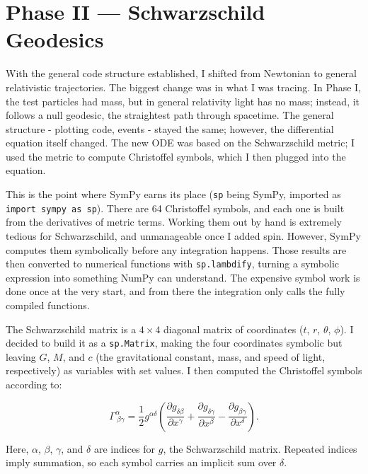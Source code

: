 \documentclass[11pt,a4paper]{article}
\begin{document}
\section{Phase II — Schwarzschild Geodesics}
\label{sec:schwarzschild}
With the general code structure established, I shifted from Newtonian to general relativistic trajectories. The biggest change was in what I was tracing. In Phase I, the test particles had mass, but in general relativity light has no mass; instead, it follows a null geodesic, the straightest path through spacetime. The general structure - plotting code, events - stayed the same; however, the differential equation itself changed. The new ODE was based on the Schwarzschild metric; I used the metric to compute Christoffel symbols, which I then plugged into the equation.

This is the point where SymPy earns its place (\texttt{sp} being SymPy, imported as \texttt{import sympy as sp}). There are 64 Christoffel symbols, and each one is built from the derivatives of metric terms. Working them out by hand is extremely tedious for Schwarzschild, and unmanageable once I added spin. However, SymPy computes them symbolically before any integration happens. Those results are then converted to numerical functions with \texttt{sp.lambdify}, turning a symbolic expression into something NumPy can understand. The expensive symbol work is done once at the very start, and from there the integration only calls the fully compiled functions.

The Schwarzschild matrix is a $4\times4$ diagonal matrix of coordinates ($t$, $r$, $\theta$, $\phi$). I decided to build it as a \texttt{sp.Matrix}, making the four coordinates symbolic but leaving $G$, $M$, and $c$ (the gravitational constant, mass, and speed of light, respectively) as variables with set values. I then computed the Christoffel symbols according to:

\begin{equation}
    \Gamma^{\alpha}_{\ \beta\gamma} = \frac{1}{2} g^{\alpha\delta}
    \left( \frac{\partial g_{\delta\beta}}{\partial x^{\gamma}}
         + \frac{\partial g_{\delta\gamma}}{\partial x^{\beta}}
         - \frac{\partial g_{\beta\gamma}}{\partial x^{\delta}} \right).
    \label{eq:christoffel}
\end{equation}

Here, $\alpha$, $\beta$, $\gamma$, and $\delta$ are indices for $g$, the Schwarzschild matrix. Repeated indices imply summation, so each symbol carries an implicit sum over $\delta$.
\end{document}
